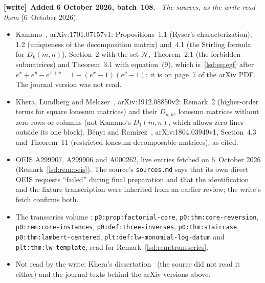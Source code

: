 \documentclass[11pt]{article}
\theoremstyle{remark}\newtheorem{remark}{Remark}
\newcommand{\file}[1]{\nolinkurl{#1}}
\newenvironment{writenote}[1][]{\par\smallskip\begingroup\small
 \noindent\textbf{[write]}\if\relax\detokenize{#1}\relax\else~\textbf{#1.}\fi\ }%
 {\par\endgroup\smallskip}
\begin{document}
\begin{writenote}[Added 6 October 2026, batch~108]
\emph{The sources, as the write read them} (6~October 2026).
\begin{itemize}\raggedright
\item Kamano~\cite{Kamano}, arXiv:1701.07157v1: Propositions~1.1 (Ryser's
 characterization), 1.2 (uniqueness of the decomposition matrix) and~4.1 (the
 Stirling formula for $D_k(m,n)$), Section~2 with the set $\mathcal N$,
 Theorem~2.1 (the forbidden submatrices) and Theorem~3.1 with
 equation~(9), which is~\eqref{lsd:eq:egf} after
 $e^x+e^y-e^{x+y}=1-(e^x-1)(e^y-1)$; it is on page~7 of the arXiv PDF. The
 journal version was not read.
\item Khera, Lundberg and Melczer~\cite{KLM}, arXiv:1912.08850v2: Remark~2
 (higher-order terms for square lonesum matrices) and their $D_{n,k}$,
 lonesum matrices without zero rows or columns (not Kamano's $D_1(m,n)$,
 which allows zero lines outside its one block).
 B\'enyi and Ram\'irez~\cite{BMRW}, arXiv:1804.03949v1, Section~4.3 and
 Theorem~11 (restricted lonesum decomposable matrices), as cited.
\item OEIS A299907, A299906 and A000262, live entries fetched on 6~October
 2026 (Remark~\ref{lsd:rem:oeis}). The source's \file{sources.md} says that its
 own direct OEIS requests ``failed'' during final preparation and that the
 identification and the fixture transcription were inherited from an earlier
 review; the write's fetch confirms both.
\item The transseries volume
 :
 \file{p0:prop:factorial-core}, \file{p0:thm:core-reversion},
 \file{p0:rem:core-instances}, \file{p0:def:three-inverses},
 \file{p0:thm:staircase}, \file{p0:thm:lambert-centered},
 \file{plt:def:lw-monomial-log-datum} and \file{plt:thm:lw-template}, read for
 Remark~\ref{lsd:rem:transseries}.
\item Not read by the write: Khera's dissertation~\cite{KheraThesis} (the
 source did not read it either) and the journal texts behind the arXiv
 versions above.
\end{itemize}


\end{writenote}
\end{document}
